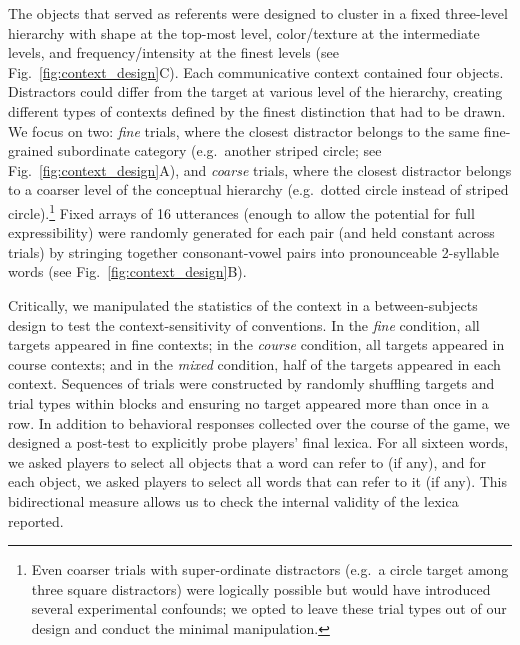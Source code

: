 The objects that served as referents were designed to cluster in a fixed three-level hierarchy with shape at the top-most level, color/texture at the intermediate levels, and frequency/intensity at the finest levels (see Fig.\ \ref{fig:context_design}C). Each communicative context contained four objects. Distractors could differ from the target at various level of the hierarchy, creating different types of contexts defined by the finest distinction that had to be drawn. We focus on two: \emph{fine} trials, where the closest distractor belongs to the same fine-grained subordinate category (e.g.\ another striped circle; see Fig.\ \ref{fig:context_design}A), and \emph{coarse} trials, where the closest distractor belongs to a coarser level of the conceptual hierarchy (e.g.\ dotted circle instead of striped circle).\footnote{Even coarser trials with super-ordinate distractors (e.g.\ a circle target among three square distractors) were logically possible but would have introduced several experimental confounds; we opted to leave these trial types out of our design and conduct the minimal manipulation.} Fixed arrays of 16 utterances (enough to allow the potential for full expressibility) were randomly generated for each pair (and held constant across trials) by stringing together consonant-vowel pairs into pronounceable 2-syllable words (see Fig.\ \ref{fig:context_design}B).

Critically, we manipulated the statistics of the context in a between-subjects design to test the context-sensitivity of conventions. 
In the \emph{fine} condition, all targets appeared in fine contexts; in the \emph{course} condition, all targets appeared in course contexts; and in the \emph{mixed} condition, half of the targets appeared in each context.
Sequences of trials were constructed by randomly shuffling targets and trial types within blocks and ensuring no target appeared more than once in a row. 
In addition to behavioral responses collected over the course of the game, we designed a post-test to explicitly probe players' final lexica. For all sixteen words, we asked players to select all objects that a word can refer to (if any), and for each object, we asked players to select all words that can refer to it (if any). 
This bidirectional measure allows us to check the internal validity of the lexica reported.

